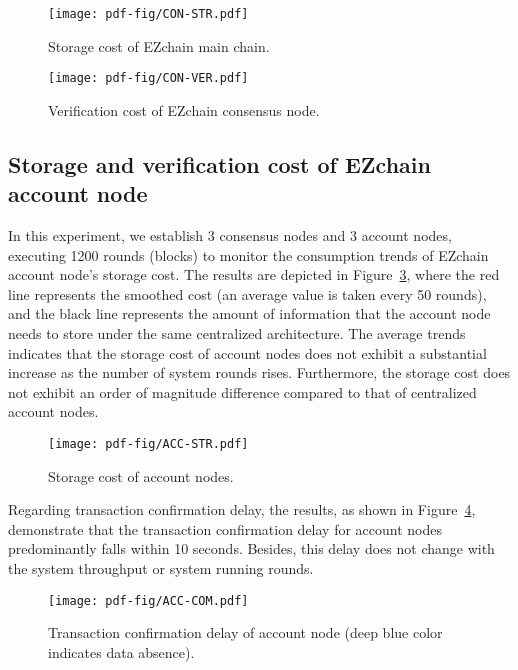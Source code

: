 \documentclass[conference]{IEEEtran}
\begin{document}
\begin{figure}[htp!]
    \centering
    \texttt{[image: pdf-fig/CON-STR.pdf]}
    \caption{Storage cost of EZchain main chain.}
    \label{fig: ex Storage cost 1}
\end{figure}

\begin{figure}[htp!]
    \centering
    \texttt{[image: pdf-fig/CON-VER.pdf]}
    \caption{Verification cost of EZchain consensus node.}
    \label{fig: ex Validation cost 1}
\end{figure}

\subsection{Storage and verification cost of EZchain account node}
\label{subsec: Storage and verification cost acc}

In this experiment, we establish 3 consensus nodes and 3 account nodes, executing 1200 rounds (blocks) to monitor the consumption trends of EZchain account node's storage cost. The results are depicted in Figure~\ref{fig: ex Storage and verification cost acc 1}, where the red line represents the smoothed cost (an average value is taken every 50 rounds), and the black line represents the amount of information that the account node needs to store under the same centralized architecture. The average trends indicates that the storage cost of account nodes does not exhibit a substantial increase as the number of system rounds rises. Furthermore, the storage cost does not exhibit an order of magnitude difference compared to that of centralized account nodes.

\begin{figure}[htp!]
    \centering
    \texttt{[image: pdf-fig/ACC-STR.pdf]}
    \caption{Storage cost of account nodes.}
    \label{fig: ex Storage and verification cost acc 1}
\end{figure}


Regarding transaction confirmation delay, the results, as shown in Figure~\ref{fig: ex Storage and verification cost acc 2}, demonstrate that the transaction confirmation delay for account nodes predominantly falls within 10 seconds. Besides, this delay does not change with the system throughput or system running rounds.

\begin{figure}[htp!]
    \centering
    \texttt{[image: pdf-fig/ACC-COM.pdf]}
    \caption{Transaction confirmation delay of account node (deep blue color indicates data absence).}
    \label{fig: ex Storage and verification cost acc 2}
\end{figure}
\end{document}
